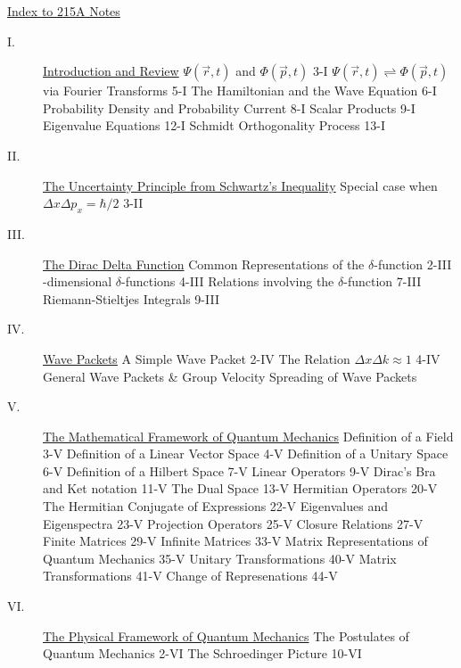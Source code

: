 \underline{Index to 215A Notes}

\begin{description}
\item[I.] \underline{Introduction and Review}
\subitem $\Psi(\vec r, t)$ and $\Phi(\vec p, t)$ \hfill 3-I
\subitem $\Psi(\vec r, t) \rightleftharpoons \Phi(\vec p, t)$ via Fourier Transforms \hfill 5-I
\subitem The Hamiltonian and the Wave Equation \hfill 6-I
\subitem Probability Density and Probability Current \hfill 8-I
\subitem Scalar Products \hfill 9-I
\subitem Eigenvalue Equations \hfill 12-I
\subitem Schmidt Orthogonality Process \hfill 13-I

\item[II.] \underline{The Uncertainty Principle from Schwartz's Inequality}
\subitem Special case when $\Delta x \Delta p_x =\hbar/2$ \hfill 3-II

\item[III.] \underline{The Dirac Delta Function}
\subitem Common Representations of the $\delta$-function \hfill 2-III
-dimensional $\delta$-functions \hfill 4-III
\subitem Relations involving the $\delta$-function \hfill 7-III
\subitem Riemann-Stieltjes Integrals \hfill 9-III

\item[IV.] \underline{Wave Packets}
\subitem A Simple Wave Packet \hfill 2-IV
\subitem The Relation $\Delta x \Delta k \approx 1$ \hfill 4-IV
\subitem General Wave Packets \& Group Velocity
\subitem Spreading of Wave Packets

\item[V.] \underline{The Mathematical Framework of Quantum Mechanics}
\subitem Definition of a Field \hfill 3-V
\subitem Definition of a Linear Vector Space \hfill 4-V
\subitem Definition of a Unitary Space \hfill 6-V
\subitem Definition of a Hilbert Space \hfill 7-V
\subitem Linear Operators \hfill 9-V
\subitem Dirac's Bra and Ket notation \hfill 11-V
\subitem The Dual Space \hfill 13-V
\subitem Hermitian Operators \hfill 20-V
\subitem The Hermitian Conjugate of Expressions \hfill 22-V
\subitem Eigenvalues and Eigenspectra \hfill 23-V
\subitem Projection Operators \hfill 25-V
\subitem Closure Relations \hfill 27-V
\subitem Finite Matrices \hfill 29-V
\subitem Infinite Matrices \hfill 33-V
\subitem Matrix Representations of Quantum Mechanics \hfill 35-V
\subitem Unitary Transformations \hfill 40-V
\subitem Matrix Transformations \hfill 41-V
\subitem Change of Represenations \hfill 44-V

\item[VI.] \underline{The Physical Framework of Quantum Mechanics}
\subitem The Postulates of Quantum Mechanics \hfill 2-VI
\subitem The Schroedinger Picture \hfill 10-VI


\end{description}
